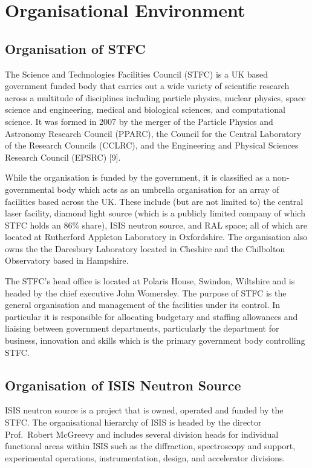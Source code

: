 \documentclass[paper=a4, fontsize=11pt]{scrartcl}	%
\numberwithin{equation}{section}															%
\numberwithin{figure}{section}																%
\numberwithin{table}{section}
\begin{document}
\section{Organisational Environment}\label{organisational-environment}

\subsection{Organisation of STFC}\label{organisation-of-stfc}

The Science and Technologies Facilities Council (STFC) is a UK based
government funded body that carries out a wide variety of scientific
research across a multitude of disciplines including particle physics,
nuclear physics, space science and engineering, medical and biological
sciences, and computational science. It was formed in 2007 by the merger
of the Particle Physics and Astronomy Research Council (PPARC), the
Council for the Central Laboratory of the Research Councils (CCLRC), and
the Engineering and Physical Sciences Research Council (EPSRC) {[}9{]}.

While the organisation is funded by the government, it is classified as
a non-governmental body which acts as an umbrella organisation for an
array of facilities based across the UK. These include (but are not
limited to) the central laser facility, diamond light source (which is a
publicly limited company of which STFC holds an 86\% share), ISIS
neutron source, and RAL space; all of which are located at Rutherford
Appleton Laboratory in Oxfordshire. The organisation also owns the the
Daresbury Laboratory located in Cheshire and the Chilbolton Observatory
based in Hampshire.

The STFC's head office is located at Polaris House, Swindon, Wiltshire
and is headed by the chief executive John Womersley. The purpose of STFC is
the general organisation and management of the facilities under its
control. In particular it is responsible for allocating budgetary and
staffing allowances and liaising between government departments,
particularly the department for business, innovation and skills which is
the primary government body controlling STFC.

\subsection{Organisation of ISIS Neutron
Source}\label{organisation-of-isis-neutron-source}

ISIS neutron source is a project that is owned, operated and funded by
the STFC. The organisational hierarchy of ISIS is headed by the director
Prof.~Robert McGreevy and includes several division heads for individual
functional areas within ISIS such as the diffraction, spectroscopy and
support, experimental operations, instrumentation, design, and
accelerator divisions.
\end{document}
